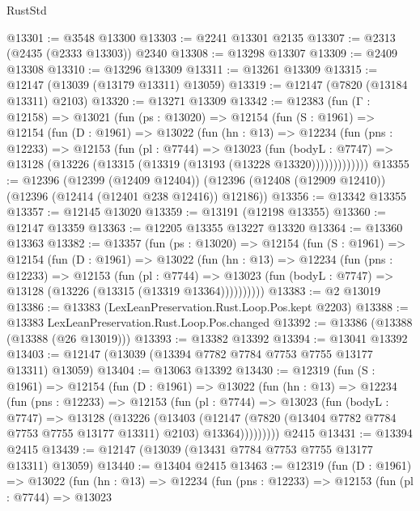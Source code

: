 \begin{lexlean}{RustStd}
\begin{coremodule}
@13301 := @3548 @13300
@13303 := @2241 @13301 @2135
@13307 := @2313 (@2435 (@2333 @13303)) @2340
@13308 := @13298 @13307
@13309 := @2409 @13308
@13310 := @13296 @13309
@13311 := @13261 @13309
@13315 := @12147 (@13039 (@13179 @13311) @13059)
@13319 := @12147 (@7820 (@13184 @13311) @2103)
@13320 := @13271 @13309
@13342 := @12383
    (fun (Γ : @12158) =>
    @13021
      (fun (ps : @13020) =>
      @12154
        (fun (S : @1961) =>
        @12154
          (fun (D : @1961) =>
          @13022
            (fun (hn : @13) =>
            @12234
              (fun (pns : @12233) =>
              @12153
                (fun (pl : @7744) =>
                @13023
                  (fun (bodyL : @7747) =>
                  @13128 (@13226 (@13315 (@13319 (@13193 (@13228 @13320)))))))))))))
@13355 := @12396
    (@12399 (@12409 @12404))
    (@12396 (@12408 (@12909 @12410)) (@12396 (@12414 (@12401 @238 @12416)) @12186))
@13356 := @13342 @13355
@13357 := @12145 @13020
@13359 := @13191 (@12198 @13355)
@13360 := @12147 @13359
@13363 := @12205 @13355 @13227 @13320
@13364 := @13360 @13363
@13382 := @13357
    (fun (ps : @13020) =>
    @12154
      (fun (S : @1961) =>
      @12154
        (fun (D : @1961) =>
        @13022
          (fun (hn : @13) =>
          @12234
            (fun (pns : @12233) =>
            @12153
              (fun (pl : @7744) =>
              @13023 (fun (bodyL : @7747) => @13128 (@13226 (@13315 (@13319 @13364))))))))))
@13383 := @2 @13019
@13386 := @13383 (LexLeanPreservation.Rust.Loop.Pos.kept @2203)
@13388 := @13383 LexLeanPreservation.Rust.Loop.Pos.changed
@13392 := @13386 (@13388 (@13388 (@26 @13019)))
@13393 := @13382 @13392
@13394 := @13041 @13392
@13403 := @12147 (@13039 (@13394 @7782 @7784 @7753 @7755 @13177 @13311) @13059)
@13404 := @13063 @13392
@13430 := @12319
    (fun (S : @1961) =>
    @12154
      (fun (D : @1961) =>
      @13022
        (fun (hn : @13) =>
        @12234
          (fun (pns : @12233) =>
          @12153
            (fun (pl : @7744) =>
            @13023
              (fun (bodyL : @7747) =>
              @13128
                (@13226
                  (@13403
                    (@12147
                      (@7820 (@13404 @7782 @7784 @7753 @7755 @13177 @13311) @2103)
                      @13364)))))))))
    @2415
@13431 := @13394 @2415
@13439 := @12147 (@13039 (@13431 @7784 @7753 @7755 @13177 @13311) @13059)
@13440 := @13404 @2415
@13463 := @12319
    (fun (D : @1961) =>
    @13022
      (fun (hn : @13) =>
      @12234
        (fun (pns : @12233) =>
        @12153
          (fun (pl : @7744) =>
          @13023

\end{coremodule}
\end{lexlean}
